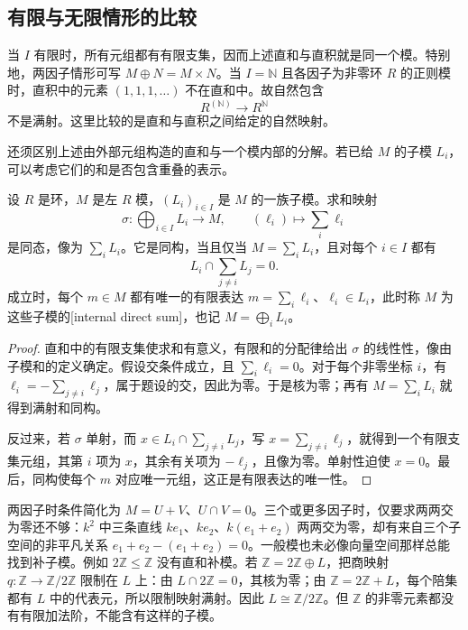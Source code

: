 \subsection{有限与无限情形的比较}
\label{b2:subsec:0204:02}

当 \(I\) 有限时，所有元组都有有限支集，因而上述直和与直积就是同一个模。特别地，两因子情形可写 \(M\oplus N=M\times N\)。当 \(I=\mathbb N\) 且各因子为非零环 \(R\) 的正则模时，直积中的元素 \((1,1,1,\ldots)\) 不在直和中。故自然包含
\[
	R^{(\mathbb N)}\longrightarrow R^{\mathbb N}
\]
不是满射。这里比较的是直和与直积之间给定的自然映射。

\ProseParagraphBreak
还须区别上述由外部元组构造的直和与一个模内部的分解。若已给 \(M\) 的子模 \(L_i\)，可以考虑它们的和是否包含重叠的表示。

\begin{proposition}\label{b2:prop:internal-direct-sum}
	设 \(R\) 是环，\(M\) 是左 \(R\) 模，\((L_i)_{i\in I}\) 是 \(M\) 的一族子模。求和映射
	\[
		\sigma:\bigoplus_{i\in I}L_i\longrightarrow M,\qquad (\ell_i)\longmapsto\sum_i\ell_i
	\]
	是同态，像为 \(\sum_iL_i\)。它是同构，当且仅当 \(M=\sum_iL_i\)，且对每个 \(i\in I\) 都有
	\[
		L_i\cap\sum_{j\ne i}L_j=0.
	\]
	成立时，每个 \(m\in M\) 都有唯一的有限表达 \(m=\sum_i\ell_i\)、\(\ell_i\in L_i\)，此时称 \(M\) 为这些子模的[internal direct sum]，也记 \(M=\bigoplus_iL_i\)。
\end{proposition}
\begin{proof}
	直和中的有限支集使求和有意义，有限和的分配律给出 \(\sigma\) 的线性性，像由子模和的定义确定。假设交条件成立，且 \(\sum_i\ell_i=0\)。对于每个非零坐标 \(i\)，有 \(\ell_i=-\sum_{j\ne i}\ell_j\)，属于题设的交，因此为零。于是核为零；再有 \(M=\sum_iL_i\) 就得到满射和同构。

	反过来，若 \(\sigma\) 单射，而 \(x\in L_i\cap\sum_{j\ne i}L_j\)，写 \(x=\sum_{j\ne i}\ell_j\)，就得到一个有限支集元组，其第 \(i\) 项为 \(x\)，其余有关项为 \(-\ell_j\)，且像为零。单射性迫使 \(x=0\)。最后，同构使每个 \(m\) 对应唯一元组，这正是有限表达的唯一性。
\end{proof}

两因子时条件简化为 \(M=U+V\)、\(U\cap V=0\)。三个或更多因子时，仅要求两两交为零还不够：\(k^2\) 中三条直线 \(ke_1\)、\(ke_2\)、\(k(e_1+e_2)\) 两两交为零，却有来自三个子空间的非平凡关系 \(e_1+e_2-(e_1+e_2)=0\)。一般模也未必像向量空间那样总能找到补子模。例如 \(2\mathbb Z\le\mathbb Z\) 没有直和补模。若 \(\mathbb Z=2\mathbb Z\oplus L\)，把商映射 \(q:\mathbb Z\to\mathbb Z/2\mathbb Z\) 限制在 \(L\) 上：由 \(L\cap2\mathbb Z=0\)，其核为零；由 \(\mathbb Z=2\mathbb Z+L\)，每个陪集都有 \(L\) 中的代表元，所以限制映射满射。因此 \(L\cong\mathbb Z/2\mathbb Z\)。但 \(\mathbb Z\) 的非零元素都没有有限加法阶，不能含有这样的子模。

